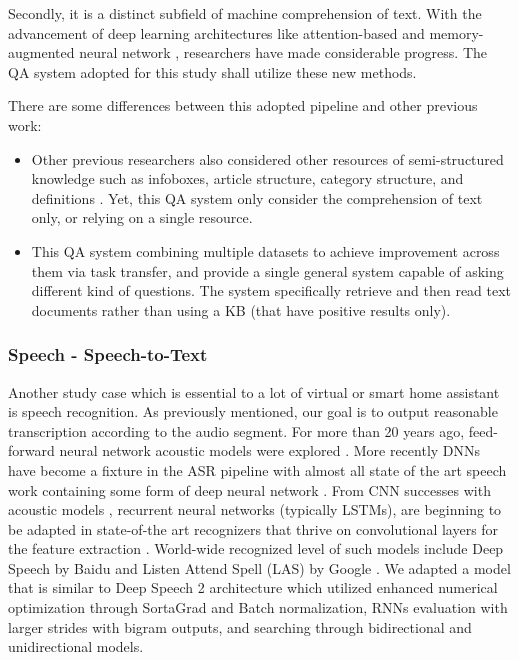 Secondly, it is a distinct subfield of machine comprehension of text. With the advancement of deep learning architectures like attention-based and memory-augmented neural network \cite{}, researchers have made considerable progress.  The QA system adopted for this study shall utilize these new methods.

There are some differences between this adopted pipeline and other previous work: 
\begin{itemize}
    \item Other previous researchers also considered other resources of semi-structured knowledge such as infoboxes, article structure, category structure, and definitions \cite{}. Yet, this QA system only consider the comprehension of text only, or relying on a single resource.
    
    \item This QA system combining multiple datasets to achieve improvement across them via task transfer, and provide a single general system capable of asking different kind of questions. The system specifically retrieve and then read text documents rather than using a KB (that have positive results only). 
\end{itemize}


\subsubsection{Speech - Speech-to-Text}

Another study case which is essential to a lot of virtual or smart home assistant is speech recognition. As previously mentioned, our goal is to output reasonable transcription according to the audio segment.  For more than 20 years ago, feed-forward
neural network acoustic models were explored \cite{}.  More recently DNNs have become a fixture in the ASR pipeline with almost all
state of the art speech work containing some form of deep neural network \cite{}. From CNN successes with acoustic models \cite{}, recurrent
neural networks (typically LSTMs), are beginning to be adapted in state-of-the art recognizers \cite{} that thrive on convolutional layers for the feature extraction \cite{}. World-wide recognized level of such models include Deep Speech by Baidu \cite{} and Listen Attend Spell (LAS) by Google \cite{}. We adapted a model that is similar to Deep Speech 2 architecture \cite{} which utilized enhanced numerical optimization through SortaGrad and Batch normalization, RNNs evaluation with larger strides with bigram outputs, and searching through bidirectional and unidirectional models.

